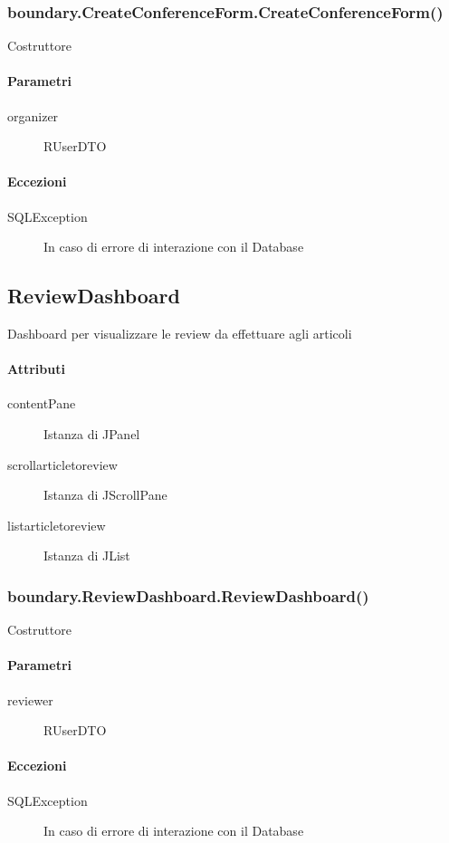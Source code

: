 \subsubsection{boundary.CreateConferenceForm.CreateConferenceForm()}
Costruttore
\paragraph{Parametri}
\begin{description}
\item[organizer] RUserDTO
\end{description}
\paragraph{Eccezioni}
\begin{description}
\item[SQLException]  In caso di errore di interazione con il Database
\end{description}

\subsection{ReviewDashboard}
Dashboard per visualizzare le review da effettuare agli articoli 
\paragraph{Attributi}
\begin{description}
\item[contentPane] Istanza di JPanel
\item[scrollarticletoreview] Istanza di JScrollPane
\item[listarticletoreview] Istanza di JList
\end{description}
\subsubsection{boundary.ReviewDashboard.ReviewDashboard()}
Costruttore
\paragraph{Parametri}
\begin{description}
\item[reviewer] RUserDTO
\end{description}
\paragraph{Eccezioni}
\begin{description}
\item[SQLException]  In caso di errore di interazione con il Database
\end{description}



